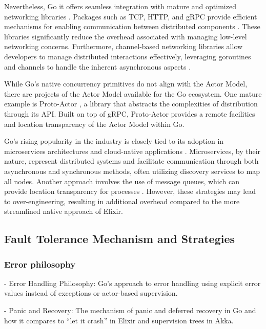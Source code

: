 Nevertheless, Go it offers seamless integration with mature and optimized networking libraries \cite{Kennedy2016}. Packages such as \gls{TCP}, \gls{HTTP}, and \gls{gRPC} provide efficient mechanisms for enabling communication between distributed components \cite{Castro2019, akka-docs}. These libraries significantly reduce the overhead associated with managing low-level networking concerns. Furthermore, channel-based networking libraries allow developers to manage distributed interactions effectively, leveraging goroutines and channels to handle the inherent asynchronous aspects \cite{Castro2019}.

While Go’s native concurrency primitives do not align with the Actor Model, there are projects of the Actor Model available for the Go ecosystem. One mature example is Proto-Actor \cite{Whitney2019}, a library that abstracts the complexities of distribution through its \gls{API}. Built on top of \gls{gRPC}, Proto-Actor provides a remote facilities and location transparency of the Actor Model within Go.

Go’s rising popularity in the industry is closely tied to its adoption in microservices architectures and cloud-native applications \cite{Zhao2023,Shuiskov2022}. Microservices, by their nature, represent distributed systems and facilitate communication through both asynchronous and synchronous methods, often utilizing discovery services to map all nodes. Another approach involves the use of message queues, which can provide location transparency for processes \cite{Shuiskov2022}. However, these strategies may lead to over-engineering, resulting in additional overhead compared to the more streamlined native approach of Elixir.

\subsection{Fault Tolerance Mechanism and Strategies}

\subsubsection{Error philosophy}

- Error Handling Philosophy: Go’s approach to error handling using explicit error values instead of exceptions or actor-based supervision.

- Panic and Recovery: The mechanism of panic and deferred recovery in Go and how it compares to “let it crash” in Elixir and supervision trees in Akka.

